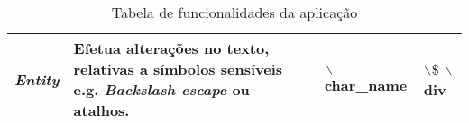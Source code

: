\documentclass[../relatorio.tex]{subfiles}
\begin{document}
\begin{landscape}
\begin{table}[!ht]
\begin{tabular}{|c|p{7cm}|p{6cm}|p{7cm}|}
                \hline
                \textit{Entity}
                &
                Efetua alterações no texto, 
                relativas a símbolos sensíveis e.g.
                \textit{Backslash escape} ou atalhos.
                &
                $\backslash$char\_name                     \newline
                &
                $\backslash\$$                            \newline
                $\backslash$div                           \newline
                \\
                \hline
            \end{tabular}
            \caption{Tabela de funcionalidades da aplicação}
            \label{table:funcs}
        \end{table}
    \end{landscape}
\end{document}
